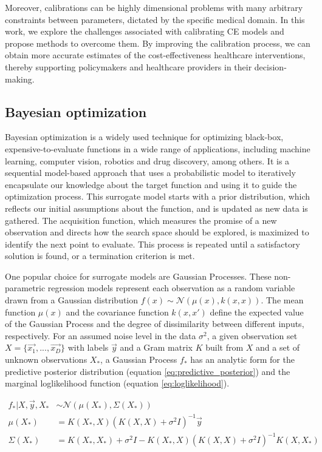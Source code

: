 \documentclass{IOS-Book-Article}
\begin{document}
	Moreover, calibrations can be highly dimensional problems with many arbitrary constraints between parameters, dictated by the specific medical domain. In this work, we explore the challenges associated with calibrating CE models and propose methods to overcome them. By improving the calibration process, we can obtain more accurate estimates of the cost-effectiveness healthcare interventions, thereby supporting policymakers and healthcare providers in their decision-making.
	
	\subsection{Bayesian optimization}
	Bayesian optimization is a widely used technique for optimizing black-box, expensive-to-evaluate functions\cite{bayesian-opt} in a wide range of applications, including machine learning, computer vision, robotics and drug discovery, among others. It is a sequential model-based approach that uses a probabilistic model to iteratively encapsulate our knowledge about the target function and using it to guide the optimization process. This surrogate model starts with a prior distribution, which reflects our initial assumptions about the function, and is updated as new data is gathered. The acquisition function, which measures the promise of a new observation and directs how the search space should be explored, is maximized to identify the next point to evaluate. This process is repeated until a satisfactory solution is found, or a termination criterion is met.
	
	One popular choice for surrogate models are Gaussian Processes\cite{gaussian-processes}. These non-parametric regression models represent each observation as a random variable drawn from a Gaussian distribution $f(x) \sim \mathcal{N}(\mu(x), k(x,x))$. The mean function $\mu(x)$ and the covariance function $k(x,x')$ define the expected value of the Gaussian Process and the degree of dissimilarity between different inputs, respectively. For an assumed noise level in the data $\sigma^2$, a given observation set $X=\{\vec{x_1}, ..., \vec{x_D}\}$ with labels $\vec{y}$ and a Gram matrix $K$ built from $X$ and a set of unknown observations $X_*$, a Gaussian Process $f_*$ has an analytic form for the predictive posterior distribution (equation \ref{eq:predictive_posterior}) and the marginal loglikelihood function (equation \ref{eq:loglikelihood}).
	
	\begin{equation} \label{eq:predictive_posterior}
		\begin{aligned}
			f_*|X,\vec{y},X_* & \sim \mathcal{N}(\mu(X_*), \Sigma(X_*)) \\
			\mu(X_*) & = K(X_*,X)(K(X,X) + \sigma^2 I)^{-1}\vec{y} \\
			\Sigma(X_*) & = K(X_*,X_*) + \sigma^2 I - K(X_*,X)(K(X,X) + \sigma^2 I)^{-1} K(X,X_*)
		\end{aligned}
	\end{equation}
	
\end{document}

